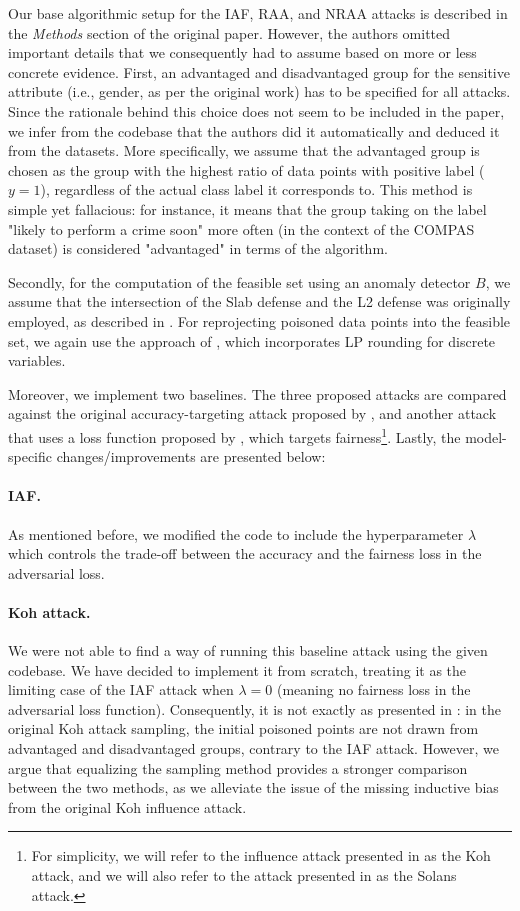 Our base algorithmic setup for the IAF, RAA, and NRAA attacks is described in the \textit{Methods} section of the original paper. However, the authors omitted important details that we consequently had to assume based on more or less concrete evidence. First, an advantaged and disadvantaged group for the sensitive attribute (i.e., gender, as per the original work) has to be specified for all attacks. Since the rationale behind this choice does not seem to be included in the paper, we infer from the codebase that the authors did it automatically and deduced it from the datasets. More specifically, we assume that the advantaged group is chosen as the group with the highest ratio of data points with positive label ($y=1$), regardless of the actual class label it corresponds to.  This method is simple yet fallacious: for instance, it means that the group taking on the label "likely to perform a crime soon" more often (in the context of the COMPAS dataset) is considered "advantaged" in terms of the algorithm. 

Secondly, for the computation of the feasible set using an anomaly detector $B$, we assume that the intersection of the Slab defense and the L2 defense was originally employed, as described in \citet{koh2018}. For reprojecting poisoned data points into the feasible set, we again use the approach of \citep{koh2018}, which incorporates LP rounding for discrete variables.

Moreover, we implement two baselines. The three proposed attacks are compared against the original accuracy-targeting attack proposed by \citet{koh2018}, and another attack that uses a loss function proposed by \citet{solans2020}, which targets fairness\footnote{For simplicity, we will refer to the influence attack presented in \citep{koh2018} as the Koh attack, and we will also refer to the attack presented in \citep{solans2020} as the Solans attack.}. Lastly, the model-specific changes/improvements are presented below:

\paragraph{IAF.} As mentioned before, we modified the code to include the hyperparameter $\lambda$ which controls the trade-off between the accuracy and the fairness loss in the adversarial loss.

\paragraph{Koh attack.} We were not able to find a way of running this baseline attack using the given codebase. We have decided to implement it from scratch, treating it as the limiting case of the IAF attack when $\lambda=0$ (meaning no fairness loss in the adversarial loss function). Consequently, it is not exactly as presented in \cite{koh2018}: in the original Koh attack sampling, the initial poisoned points are not drawn from advantaged and disadvantaged groups, contrary to the IAF attack. However, we argue that equalizing the sampling method provides a stronger comparison between the two methods, as we alleviate the issue of the missing inductive bias from the original Koh influence attack.  

